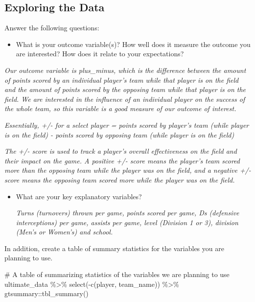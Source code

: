 \documentclass[
  letterpaper,
  DIV=11,
  numbers=noendperiod]{scrartcl}
\newenvironment{Shaded}{\begin{snugshade}}{\end{snugshade}}
\newcommand{\CommentTok}[1]{\textcolor[rgb]{0.37,0.37,0.37}{#1}}
\newcommand{\FunctionTok}[1]{\textcolor[rgb]{0.28,0.35,0.67}{#1}}
\newcommand{\NormalTok}[1]{\textcolor[rgb]{0.00,0.23,0.31}{#1}}
\newcommand{\SpecialCharTok}[1]{\textcolor[rgb]{0.37,0.37,0.37}{#1}}
\providecommand{\tightlist}{%
  \setlength{\itemsep}{0pt}\setlength{\parskip}{0pt}}\usepackage{longtable,booktabs,array}
\begin{document}
\subsection{Exploring the Data}\label{exploring-the-data}

Answer the following questions:

\begin{itemize}
\tightlist
\item
  What is your outcome variable(s)? How well does it measure the outcome
  you are interested? How does it relate to your expectations?
\end{itemize}

\emph{Our outcome variable is plus\_minus, which is the difference
between the amount of points scored by an individual player's team while
that player is on the field and the amount of points scored by the
opposing team while that player is on the field. We are interested in
the influence of an individual player on the success of the whole team,
so this variable is a good measure of our outcome of interest.}

\emph{Essentially, +/- for a select player = points scored by player's
team (while player is on the field) - points scored by opposing team
(while player is on the field)}

\emph{The +/- score is used to track a player's overall effectiveness on
the field and their impact on the game. A positive +/- score means the
player's team scored more than the opposing team while the player was on
the field, and a negative +/- score means the opposing team scored more
while the player was on the field.}

\begin{itemize}
\item
  What are your key explanatory variables?

  \emph{Turns (turnovers) thrown per game, points scored per game, Ds
  (defensive interceptions) per game, assists per game, level (Division
  1 or 3), division (Men's or Women's) and school.}
\end{itemize}

In addition, create a table of summary statistics for the variables you
are planning to use.

\begin{Shaded}
\begin{Highlighting}[]
\CommentTok{\# A table of summarizing statistics of the variables we are planning to use }
\NormalTok{ultimate\_data }\SpecialCharTok{\%\textgreater{}\%} \FunctionTok{select}\NormalTok{(}\SpecialCharTok{{-}}\FunctionTok{c}\NormalTok{(player, team\_name)) }\SpecialCharTok{\%\textgreater{}\%}\NormalTok{ gtsummary}\SpecialCharTok{::}\FunctionTok{tbl\_summary}\NormalTok{()}
\end{Highlighting}
\end{Shaded}
\end{document}

